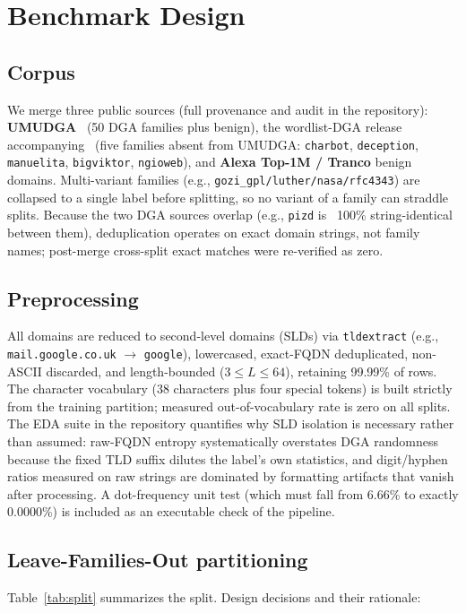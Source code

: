 \documentclass[conference]{IEEEtran}
\begin{document}
\section{Benchmark Design}
\subsection{Corpus}
We merge three public sources (full provenance and audit in the repository): \textbf{UMUDGA}~\cite{zago2020dib,zago2020cose} (50 DGA families plus benign), the wordlist-DGA release accompanying~\cite{leyva2026} (five families absent from UMUDGA: \texttt{charbot}, \texttt{deception}, \texttt{manuelita}, \texttt{bigviktor}, \texttt{ngioweb}), and \textbf{Alexa Top-1M / Tranco} benign domains. Multi-variant families (e.g., \texttt{gozi\_gpl/luther/nasa/rfc4343}) are collapsed to a single label before splitting, so no variant of a family can straddle splits. Because the two DGA sources overlap (e.g., \texttt{pizd} is ~100\% string-identical between them), deduplication operates on exact domain strings, not family names; post-merge cross-split exact matches were re-verified as zero.

\subsection{Preprocessing}
All domains are reduced to second-level domains (SLDs) via \texttt{tldextract} (e.g., \texttt{mail.google.co.uk} $\to$ \texttt{google}), lowercased, exact-FQDN deduplicated, non-ASCII discarded, and length-bounded ($3 \le L \le 64$), retaining 99.99\% of rows. The character vocabulary (38 characters plus four special tokens) is built strictly from the training partition; measured out-of-vocabulary rate is zero on all splits. The EDA suite in the repository quantifies why SLD isolation is necessary rather than assumed: raw-FQDN entropy systematically overstates DGA randomness because the fixed TLD suffix dilutes the label's own statistics, and digit/hyphen ratios measured on raw strings are dominated by formatting artifacts that vanish after processing. A dot-frequency unit test (which must fall from 6.66\% to exactly 0.0000\%) is included as an executable check of the pipeline.

\subsection{Leave-Families-Out partitioning}
Table~\ref{tab:split} summarizes the split. Design decisions and their rationale:
\end{document}
